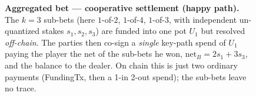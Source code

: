 \documentclass[11pt]{article}
\begin{document}
\begin{figure}[h]
\caption{\textbf{Aggregated bet --- cooperative settlement (happy path).} The $k=3$ sub-bets
(here $1$-of-$2$, $1$-of-$4$, $1$-of-$3$, with independent un-quantized stakes $s_1,s_2,s_3$)
are funded into one pot $U_1$ but resolved \emph{off-chain}. The parties then co-sign a
\emph{single} key-path spend of $U_1$ paying the player the net of the sub-bets he won,
$\mathrm{net}_B = 2s_1 + 3s_3$, and the balance to the dealer. On chain this is just two
ordinary payments (FundingTx, then a 1-in 2-out spend); the sub-bets leave no trace.}
\label{fig:agg}
\end{figure}
\end{document}
